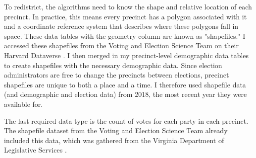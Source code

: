 To redistrict, the algorithms need to know the shape and relative location of each precinct. In practice, this means every precinct has a polygon associated with it and a coordinate reference system that describes where these polygons fall in space. These data tables with the geometry column are known as "shapefiles." I accessed these shapefiles from the Voting and Election Science Team on their Harvard Dataverse \parencite{votingelectionscienceteam2019}. I then merged in my precinct-level demographic data tables to create shapefiles with the necessary demographic data. Since election administrators are free to change the precincts between elections, precinct shapefiles are unique to both a place and a time. I therefore used shapefile data (and demographic and election data) from 2018, the most recent year they were available for.

The last required data type is the count of votes for each party in each precinct. The shapefile dataset from the Voting and Election Science Team already included this data, which was gathered from the Virginia Department of Legislative Services \parencite{votingelectionscienceteam2019}.